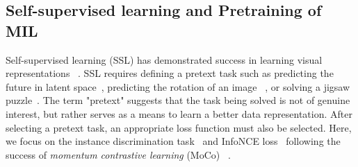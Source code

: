 

\subsection{Self-supervised learning and Pretraining of MIL}
Self-supervised learning (SSL) has demonstrated success in learning visual representations ~\citep{oord2018representation, chen2020simple, he2020momentum, chen2020improved, grill2020bootstrap, caron2020unsupervised, chen2021exploring}. %
SSL requires defining a pretext task such as
predicting the future in latent space~\citep{oord2018representation},
predicting the rotation of an image ~\citep{gidaris2018unsupervised},
or solving a jigsaw puzzle~\citep{noroozi2016unsupervised}.  %
The term "pretext" suggests that the task being solved is not of genuine interest, but rather serves as a means to learn a better data representation. 
After selecting a pretext task, an appropriate loss function must also be selected.
Here, we focus on the instance discrimination task~\citep{wu2018unsupervised} and  InfoNCE loss~\citep{oord2018representation} following the success of \emph{momentum contrastive learning} (MoCo) ~\citep{he2020momentum,chen2020improved}. 


